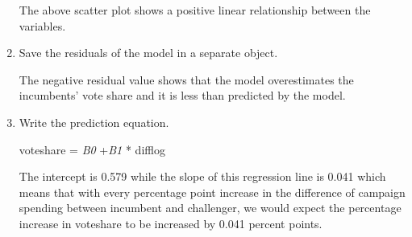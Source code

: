 \documentclass[12pt,letterpaper]{article}
\begin{document}
\begin{enumerate}
\begin{figure}[h!]
		\end{figure}
		
		The above scatter plot shows a positive linear relationship between the variables.    
		
		\vspace*{2cm}
		
		\item Save the residuals of the model in a separate object.			
		
		
		The negative residual value shows that the model overestimates the incumbents' vote share and it is less than predicted by the model. 
		
		\item Write the prediction equation.
		
		voteshare = \textit{B0} +\textit{B1} * difflog
		
		The intercept is 0.579 while the slope of this regression line is 0.041 which means that with every percentage point increase in the difference of campaign spending between incumbent and challenger, we would expect the percentage increase in voteshare to be increased by 0.041 percent points.
		 
	\end{enumerate}
	
\newpage
\end{document}
